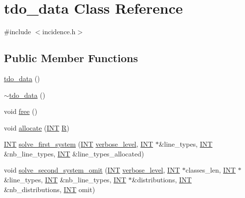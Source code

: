 \hypertarget{classtdo__data}{}\section{tdo\+\_\+data Class Reference}
\label{classtdo__data}


{\ttfamily \#include $<$incidence.\+h$>$}

\subsection*{Public Member Functions}
\begin{DoxyCompactItemize}
\item 
\mbox{\hyperlink{classtdo__data_a7198b60c6ab85328d7bc41fc2ab679b4}{tdo\+\_\+data}} ()
\item 
\mbox{\hyperlink{classtdo__data_aa1befa7ab575f6456b51a2fa152a07de}{$\sim$tdo\+\_\+data}} ()
\item 
void \mbox{\hyperlink{classtdo__data_a351c38cc004470120f278d4ba938e98f}{free}} ()
\item 
void \mbox{\hyperlink{classtdo__data_a56fbeb13b7e63c64f087a02c6375e705}{allocate}} (\mbox{\hyperlink{galois_8h_a09fddde158a3a20bd2dcadb609de11dc}{I\+NT}} \mbox{\hyperlink{pentomino__5x5_8_c_a9e6c5a8291295bd0292db81cc90cb2cf}{R}})
\item 
\mbox{\hyperlink{galois_8h_a09fddde158a3a20bd2dcadb609de11dc}{I\+NT}} \mbox{\hyperlink{classtdo__data_aa62a57bd301396164352018141e4966e}{solve\+\_\+first\+\_\+system}} (\mbox{\hyperlink{galois_8h_a09fddde158a3a20bd2dcadb609de11dc}{I\+NT}} \mbox{\hyperlink{simeon_8_c_a818073fbcc2f439e7c56952f67386122}{verbose\+\_\+level}}, \mbox{\hyperlink{galois_8h_a09fddde158a3a20bd2dcadb609de11dc}{I\+NT}} $\ast$\&line\+\_\+types, \mbox{\hyperlink{galois_8h_a09fddde158a3a20bd2dcadb609de11dc}{I\+NT}} \&nb\+\_\+line\+\_\+types, \mbox{\hyperlink{galois_8h_a09fddde158a3a20bd2dcadb609de11dc}{I\+NT}} \&line\+\_\+types\+\_\+allocated)
\item 
void \mbox{\hyperlink{classtdo__data_a4feb5aa7d2fb44863579b0cf45502f44}{solve\+\_\+second\+\_\+system\+\_\+omit}} (\mbox{\hyperlink{galois_8h_a09fddde158a3a20bd2dcadb609de11dc}{I\+NT}} \mbox{\hyperlink{simeon_8_c_a818073fbcc2f439e7c56952f67386122}{verbose\+\_\+level}}, \mbox{\hyperlink{galois_8h_a09fddde158a3a20bd2dcadb609de11dc}{I\+NT}} $\ast$classes\+\_\+len, \mbox{\hyperlink{galois_8h_a09fddde158a3a20bd2dcadb609de11dc}{I\+NT}} $\ast$\&line\+\_\+types, \mbox{\hyperlink{galois_8h_a09fddde158a3a20bd2dcadb609de11dc}{I\+NT}} \&nb\+\_\+line\+\_\+types, \mbox{\hyperlink{galois_8h_a09fddde158a3a20bd2dcadb609de11dc}{I\+NT}} $\ast$\&distributions, \mbox{\hyperlink{galois_8h_a09fddde158a3a20bd2dcadb609de11dc}{I\+NT}} \&nb\+\_\+distributions, \mbox{\hyperlink{galois_8h_a09fddde158a3a20bd2dcadb609de11dc}{I\+NT}} omit)

\end{DoxyCompactItemize}
